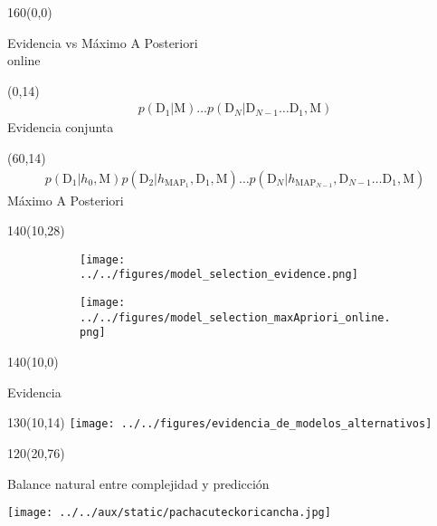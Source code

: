\documentclass[shownotes,aspectratio=169]{beamer}
\begin{document}
\begin{frame}[plain]
\begin{textblock}{160}(0,0)
\begin{center}
 \large Evidencia vs M\'aximo A Posteriori \\
 \normalsize online
\end{center}
\end{textblock}


\begin{textblock}{60}(0,14)
 \centering \footnotesize
 \begin{align*} 
 p(\text{D}_1|\text{M}) \dots p(\text{D}_N|\text{D}_{N-1} \dots \text{D}_1, \text{M})
\end{align*}
Evidencia conjunta
\end{textblock}

\begin{textblock}{80}(60,14)
 \centering \footnotesize
\begin{align*}
 p(\text{D}_1|h_0 , \text{M}) p(\text{D}_2|h_{\text{MAP}_1}, \text{D}_1, \text{M}) \dots p(\text{D}_N|h_{\text{MAP}_{N-1}} , \text{D}_{N-1} \dots \text{D}_1, \text{M})
\end{align*}
 M\'aximo A Posteriori
\end{textblock}


\begin{textblock}{140}(10,28)
     \centering 
       \begin{figure}[H]     
     \centering 
     \begin{subfigure}[b]{0.47\textwidth}
       \texttt{[image: ../../figures/model\_selection\_evidence.png]}
     \end{subfigure}
     \begin{subfigure}[b]{0.49\textwidth}
       \texttt{[image: ../../figures/model\_selection\_maxApriori\_online.png]}
     \end{subfigure}
\end{figure}
\end{textblock}



\end{frame}


\begin{frame}[plain]
\begin{textblock}{140}(10,0)
 \begin{center}
  \Large  Evidencia
 \end{center}
\end{textblock}


 \begin{textblock}{130}(10,14)
  \centering
  \texttt{[image: ../../figures/evidencia\_de\_modelos\_alternativos]} 
 \end{textblock} 
 
 
 \begin{textblock}{120}(20,76)
  \begin{mdframed}[backgroundcolor=black!15]
\centering
  Balance natural entre complejidad y predicci\'on
  \end{mdframed}
 \end{textblock}
\end{frame}
 
\begin{frame}[plain]
\centering
  \texttt{[image: ../../aux/static/pachacuteckoricancha.jpg]}
\end{frame}
\end{document}
